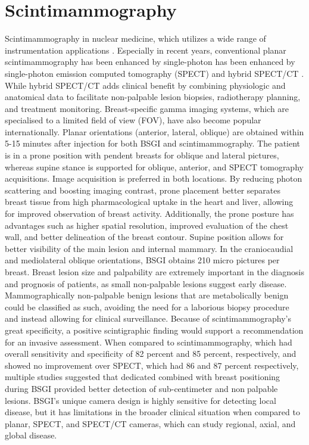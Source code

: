 \documentclass{article}
\begin{document}
\section{Scintimammography}
Scintimammography in nuclear medicine, which utilizes a wide range of instrumentation 
applications . Especially in recent years, conventional planar scintimammography has been 
enhanced by single-photon has been enhanced by single-photon emission computed 
tomography (SPECT) and hybrid SPECT/CT . While hybrid SPECT/CT adds clinical benefit by 
combining physiologic and anatomical data to facilitate non-palpable lesion biopsies, 
radiotherapy planning, and treatment monitoring. Breast-specific gamma imaging systems, 
which are specialised to a limited field of view (FOV), have also become popular 
internationally. Planar orientations (anterior, lateral, oblique) are obtained within 5-15 
minutes after injection for both BSGI and scintimammography. The patient is in a prone 
position with pendent breasts for oblique and lateral pictures, whereas supine stance is 
supported for oblique, anterior, and SPECT tomography acquisitions. Image acquisition is 
preferred in both locations. By reducing photon scattering and boosting imaging contrast, 
prone placement better separates breast tissue from high pharmacological uptake in the 
heart and liver, allowing for improved observation of breast activity.
Additionally, the prone posture has advantages such as higher spatial resolution, improved 
evaluation of the chest wall, and better delineation of the breast contour. Supine position 
allows for better visibility of the main lesion and internal mammary. In the craniocaudial and 
mediolateral oblique orientations, BSGI obtains 210 micro pictures per breast. Breast lesion 
size and palpability are extremely important in the diagnosis and prognosis of patients, as 
small non-palpable lesions suggest early disease. Mammographically non-palpable benign 
lesions that are metabolically benign could be classified as such, avoiding the need for a 
laborious biopsy procedure and instead allowing for clinical surveillance. Because of 
scintimammography's great specificity, a positive scintigraphic finding would support a 
recommendation for an invasive assessment.
When compared to scintimammography, which had overall sensitivity and specificity of 82 
percent and 85 percent, respectively, and showed no improvement over SPECT, which had 
86 and 87 percent respectively, multiple studies suggested that dedicated combined with 
breast positioning during BSGI provided better detection of sub-centimeter and nonpalpable lesions. BSGI's unique camera design is highly sensitive for detecting local disease, 
but it has limitations in the broader clinical situation when compared to planar, SPECT, and 
SPECT/CT cameras, which can study regional, axial, and global disease.
\end{document}
